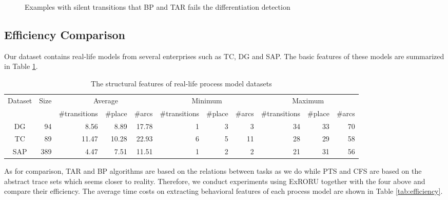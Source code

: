 \documentclass{llncs}
\begin{document}
\begin{figure}[htbp]
{\begin{minipage}[b]{0.27\textwidth}
	\end{minipage}
	\label{fig:silentExampleC}
}
\caption{Examples with silent transitions that BP and TAR fails the differentiation detection\label{fig:silentExamples}}
\end{figure}

\subsection{Efficiency Comparison}\label{subsec:efficiency}
Our dataset contains real-life models from several enterprises such as TC, DG and SAP. The basic features of these models are summarized in Table \ref{tab:datasets}.

\begin{table}[htbp]
\centering
\caption{The structural features of real-life process model datasets\label{tab:datasets}}
\scriptsize
\begin{tabular}{|c|r|r|r|r|r|r|r|r|r|r|} \hline
	\multicolumn{1}{|c|}{\multirow{2}{*}{Dataset}} & \multicolumn{1}{c|}{\multirow{2}{*}{Size}} & \multicolumn{3}{|c}{Average} & \multicolumn{3}{|c}{Minimum} & \multicolumn{3}{|c|}{Maximum}\\ \cline{3-11}
	\multicolumn{1}{|c|}{} & \multicolumn{1}{c|}{} & \multicolumn{1}{c|}{\#transitions} & \multicolumn{1}{c|}{\#place} & \multicolumn{1}{c|}{\#arcs} & \multicolumn{1}{c|}{\#transitions} & \multicolumn{1}{c|}{\#place} & \multicolumn{1}{c|}{\#arcs} & \multicolumn{1}{c|}{\#transitions} & \multicolumn{1}{c|}{\#place} & \multicolumn{1}{c|}{\#arcs}\\ \hline
	DG & 94 & 8.56 & 8.89 & 17.78 & 1 & 3 & 3 & 34 & 33 & 70 \\ \hline
	TC & 89 & 11.47 & 10.28 & 22.93 & 6 & 5 & 11 & 28 & 29 & 58 \\ \hline
	SAP & 389 & 4.47 & 7.51 & 11.51 & 1 & 2 & 2 & 21 & 31 & 56 \\ \hline
\end{tabular}
\end{table}

As for comparison, TAR and BP algorithms are based on the relations between tasks as we do while PTS and CFS are based on the abstract trace sets which seems closer to reality. Therefore, we conduct experiments using ExRORU together with the four above and compare their efficiency. The average time costs on extracting behavioral features of each process model are shown in Table \ref{tab:efficiency}.
\end{document}
